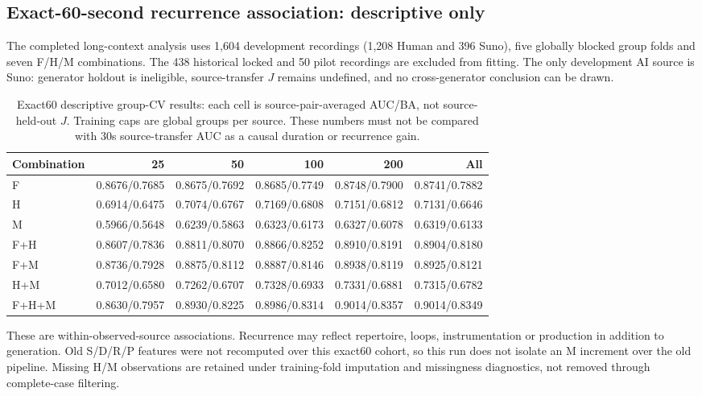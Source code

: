\subsection{Exact-60-second recurrence association: descriptive only}
The completed long-context analysis uses 1,604 development recordings (1,208 Human and 396 Suno), five globally blocked group folds and seven F/H/M combinations. The 438 historical locked and 50 pilot recordings are excluded from fitting. The only development AI source is Suno: generator holdout is ineligible, source-transfer $J$ remains undefined, and no cross-generator conclusion can be drawn.

\begin{table}[htbp]
\centering\footnotesize\setlength{\tabcolsep}{4pt}
\caption{Exact60 descriptive group-CV results: each cell is source-pair-averaged AUC/BA, not source-held-out $J$. Training caps are global groups per source. These numbers must not be compared with 30s source-transfer AUC as a causal duration or recurrence gain.}
\label{tab:fhm60-group-only}
\begin{tabular}{lrrrrr}
\toprule Combination & 25 & 50 & 100 & 200 & All \\
\midrule
F & 0.8676/0.7685 & 0.8675/0.7692 & 0.8685/0.7749 & 0.8748/0.7900 & 0.8741/0.7882 \\
H & 0.6914/0.6475 & 0.7074/0.6767 & 0.7169/0.6808 & 0.7151/0.6812 & 0.7131/0.6646 \\
M & 0.5966/0.5648 & 0.6239/0.5863 & 0.6323/0.6173 & 0.6327/0.6078 & 0.6319/0.6133 \\
F+H & 0.8607/0.7836 & 0.8811/0.8070 & 0.8866/0.8252 & 0.8910/0.8191 & 0.8904/0.8180 \\
F+M & 0.8736/0.7928 & 0.8875/0.8112 & 0.8887/0.8146 & 0.8938/0.8119 & 0.8925/0.8121 \\
H+M & 0.7012/0.6580 & 0.7262/0.6707 & 0.7328/0.6933 & 0.7331/0.6881 & 0.7315/0.6782 \\
F+H+M & 0.8630/0.7957 & 0.8930/0.8225 & 0.8986/0.8314 & 0.9014/0.8357 & 0.9014/0.8349 \\
\bottomrule
\end{tabular}
\end{table}

These are within-observed-source associations. Recurrence may reflect repertoire, loops, instrumentation or production in addition to generation. Old S/D/R/P features were not recomputed over this exact60 cohort, so this run does not isolate an M increment over the old pipeline. Missing H/M observations are retained under training-fold imputation and missingness diagnostics, not removed through complete-case filtering.
